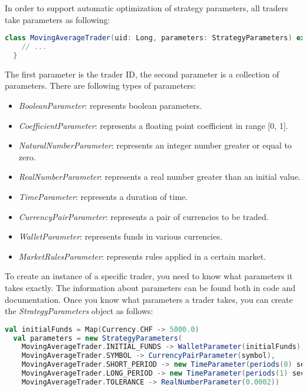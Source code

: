 In order to support automatic optimization of strategy parameters, all traders take parameters as following:

\begin{lstlisting}[language=Scala]
  class MovingAverageTrader(uid: Long, parameters: StrategyParameters) extends Trader(uid, parameters) {
    // ...
  }
\end{lstlisting}

The first parameter is the trader ID, the second parameter is a collection of parameters. There are following types of parameters:

\begin{itemize}
\item \emph{BooleanParameter}: represents boolean parameters.
\item \emph{CoefficientParameter}: represents a floating point coefficient in range [0, 1].
\item \emph{NaturalNumberParameter}: represents an integer number greater or equal to zero.
\item \emph{RealNumberParameter}: represents a real number greater than an initial value.
\item \emph{TimeParameter}: represents a duration of time.
\item \emph{CurrencyPairParameter}: represents a pair of currencies to be traded.
\item \emph{WalletParameter}: represents funds in various currencies.
\item \emph{MarketRulesParameter}: represents rules applied in a certain market.
\end{itemize}

To create an instance of a specific trader, you need to know what parameters it takes exactly. The information about parameters can be found both in code and documentation. Once you know what parameters a trader takes, you can create the \emph{StrategyParameters} object as follows:

\begin{lstlisting}[language=Scala]
  val initialFunds = Map(Currency.CHF -> 5000.0)
  val parameters = new StrategyParameters(
    MovingAverageTrader.INITIAL_FUNDS -> WalletParameter(initialFunds),
    MovingAverageTrader.SYMBOL -> CurrencyPairParameter(symbol),
    MovingAverageTrader.SHORT_PERIOD -> new TimeParameter(periods(0) seconds),
    MovingAverageTrader.LONG_PERIOD -> new TimeParameter(periods(1) seconds),
    MovingAverageTrader.TOLERANCE -> RealNumberParameter(0.0002))
\end{lstlisting}

